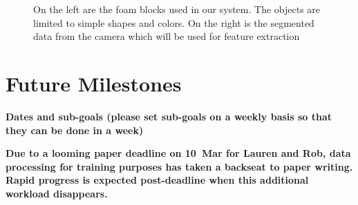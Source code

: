 \documentclass[11pt]{article}
\newcommand{\xxx}[1]{{\bf \color{red} #1}}
\newcommand{\meh}[1]{{\bf \color{blue} #1}}
\begin{document}
\begin{figure}
\centering
{}
\caption{On the left are the foam blocks used in our system. The objects are limited to simple shapes and colors. On the right is the segmented data from the camera which will be used for feature extraction}
\label{fig:objects}
\end{figure}

\section{Future Milestones}
\xxx{Dates and sub-goals (please set sub-goals on a weekly basis so that they
    can be done in a week)}

\meh{Due to a looming paper deadline on 10~Mar for Lauren and Rob, data
    processing for training purposes has taken a backseat to paper writing.
    Rapid progress is expected post-deadline when this additional workload
    disappears.}
\end{document}
